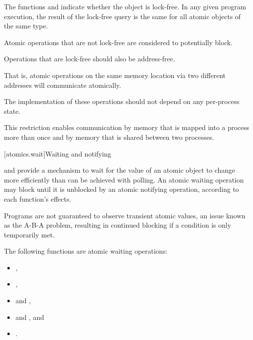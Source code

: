 \pnum
The functions  and
indicate whether the object is lock-free. In any given program execution, the
result of the lock-free query
is the same for all atomic objects of the same type.

\pnum
Atomic operations that are not lock-free are considered to potentially
block.

\pnum
\recommended
Operations that are lock-free should also be address-free.
\begin{footnote}
That is,
atomic operations on the same memory location via two different addresses will
communicate atomically.
\end{footnote}
The implementation of these operations should not depend on any per-process state.
\begin{note}
This restriction enables communication by memory that is
mapped into a process more than once and by memory that is shared between two
processes.
\end{note}

[atomics.wait]{Waiting and notifying}

\pnum
{}
and 
provide a mechanism to wait for the value of an atomic object to change
more efficiently than can be achieved with polling.
An atomic waiting operation may block until it is unblocked
by an atomic notifying operation, according to each function's effects.
\begin{note}
Programs are not guaranteed to observe transient atomic values,
an issue known as the A-B-A problem,
resulting in continued blocking if a condition is only temporarily met.
\end{note}

\pnum
\begin{note}
The following functions are atomic waiting operations:
\begin{itemize}
\item {},
\item {},
\item {} and ,
\item {} and , and
\item {}.
\end{itemize}
\end{note}

